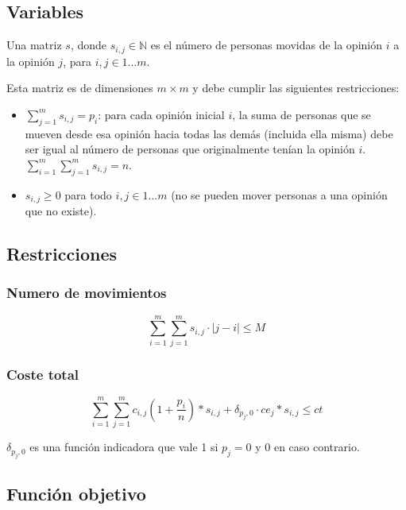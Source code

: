 \subsection{Variables}

Una matriz $s$, donde $s_{ i,j } \in \mathbb{ N }$ es el número de personas movidas de la opinión $i$ a la opinión $j$, para $i,j \in 1 \dots m$.

Esta matriz es de dimensiones $m \times m$ y debe cumplir las siguientes restricciones:

\begin{itemize}
	\item $\sum_{ j = 1 }^m s_{ i,j } = p_i$: para cada opinión inicial $i$, la suma de personas que se mueven desde esa opinión hacia todas las demás (incluida ella misma) debe ser igual al número de personas que originalmente tenían la opinión $i$. $\sum_{ i = 1 }^m \sum_{ j = 1 }^m s_{ i,j } = n$.

	\item $s_{ i,j } \geq 0$ para todo $i,j \in 1 \dots m$ (no se pueden mover personas a una opinión que no existe).
\end{itemize}

\subsection{Restricciones}

\subsubsection{Numero de movimientos}

\begin{equation}
	\sum_{ i = 1 }^m \sum_{ j = 1 }^m s_{ i,j } \cdot |j-i| \leq M
\end{equation}

\subsubsection{Coste total}

\begin{equation}
	\sum_{ i = 1 }^m \sum_{ j = 1 }^m c_{ i,j } \left (1 + \frac{ p_i }{ n } \right ) * s_{ i,j } + \delta_{ p_j, 0 } \cdot ce_j * s_{ i,j } \leq ct
\end{equation}

$\delta_{ p_j, 0 }$ es una función indicadora que vale 1 si $p_j = 0$ y 0 en caso contrario.

\subsection{Función objetivo}

